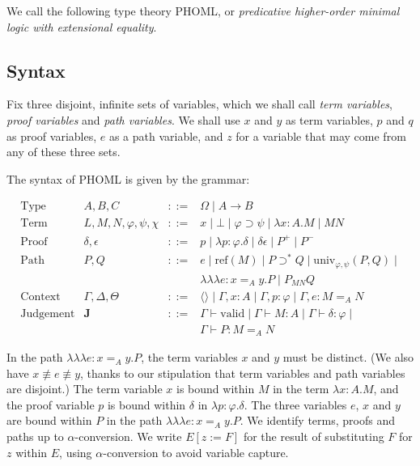 \documentclass[a4paper,UKenglish]{lipics-v2016}
\newcommand*{\reff}[1]{\ensuremath{\mathrm{ref} \left( {#1} \right)}}
\newcommand*{\univ}[4]{\ensuremath{\mathrm{univ}_{{#1}, {#2}} \left({#3} , {#4} \right)}}
\newcommand*{\triplelambda}{\ensuremath{\lambda \!\! \lambda \!\! \lambda}}
\newcommand*{\vald}{\ensuremath{\vdash \mathrm{valid}}}
\theoremstyle{plain}
\theoremstyle{definition}
\begin{document}
We call the following type theory PHOML, or \emph{predicative higher-order minimal logic with extensional equality}.  

\subsection{Syntax}

Fix three disjoint, infinite sets of variables, which we shall call \emph{term variables}, \emph{proof variables}
and \emph{path variables}.  We shall use $x$ and $y$ as term variables, $p$ and $q$ as proof variables,
$e$ as a path variable, and $z$ for a variable that may come from any of these three sets.

The syntax of PHOML is given by the grammar:

$$
\begin{array}{lrcl}
\text{Type} & A,B,C & ::= & \Omega \mid A \rightarrow B \\
\text{Term} & L,M,N, \varphi,\psi,\chi & ::= & x \mid \bot \mid \varphi \supset \psi \mid \lambda x:A.M \mid MN \\
\text{Proof} & \delta, \epsilon & ::= & p \mid \lambda p:\varphi.\delta \mid \delta \epsilon \mid P^+ \mid P^- \\
\text{Path} & P, Q & ::= & e \mid \reff{M} \mid P \supset^* Q \mid \univ{\varphi}{\psi}{P}{Q} \mid \\
& & & \triplelambda e : x =_A y. P \mid P_{MN} Q \\
\text{Context} & \Gamma, \Delta, \Theta & ::= & \langle \rangle \mid \Gamma, x : A \mid \Gamma, p : \varphi \mid \Gamma, e : M =_A N \\
\text{Judgement} & \mathbf{J} & ::= & \Gamma \vald \mid \Gamma \vdash M : A \mid \Gamma \vdash \delta : \varphi \mid \\
& & & \Gamma \vdash P : M =_A N
\end{array}
$$

In the path $\triplelambda e : x =_A y . P$, the term variables $x$ and $y$ must be distinct.  (We also have $x \not\equiv e \not\equiv y$, thanks to our
stipulation that term variables and path variables are disjoint.)  The term variable $x$ is bound within $M$ in the term $\lambda x:A.M$,
and the proof variable $p$ is bound within $\delta$ in $\lambda p:\varphi.\delta$.  The three variables $e$, $x$ and $y$ are bound within $P$ in the path
$\triplelambda e:x =_A y.P$.  We identify terms, proofs and paths up to $\alpha$-conversion.  We write $E[z:=F]$ for the result of substituting $F$ for $z$ within
$E$, using $\alpha$-conversion to avoid variable capture.
\end{document}
